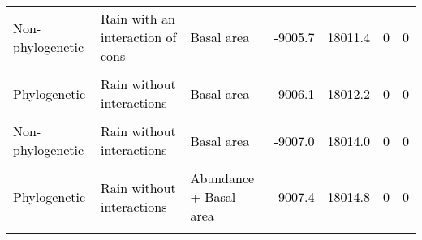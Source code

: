 \documentclass[
  12pt,
  letterpaper,
  DIV=11,
  numbers=noendperiod]{scrartcl}
\begin{document}
\begin{table}[H]
{\begin{tabular}[t]{lllllll}
\textcolor{black}{Non-phylogenetic} & \textcolor{black}{Rain with an interaction of cons} & \textcolor{black}{Basal area} & \textcolor{black}{-9005.7} & \textcolor{black}{18011.4} & \textcolor{black}{0} & \textcolor{black}{0}\\
\cellcolor{gray!6}{\textcolor{black}{Phylogenetic}} & \cellcolor{gray!6}{\textcolor{black}{Rain without interactions}} & \cellcolor{gray!6}{\textcolor{black}{Abundance}} & \cellcolor{gray!6}{\textcolor{black}{-9005.7}} & \cellcolor{gray!6}{\textcolor{black}{18011.4}} & \cellcolor{gray!6}{\textcolor{black}{0}} & \cellcolor{gray!6}{\textcolor{black}{0}}\\
\addlinespace
\textcolor{black}{Phylogenetic} & \textcolor{black}{Rain without interactions} & \textcolor{black}{Basal area} & \textcolor{black}{-9006.1} & \textcolor{black}{18012.2} & \textcolor{black}{0} & \textcolor{black}{0}\\
\cellcolor{gray!6}{\textcolor{black}{Phylogenetic}} & \cellcolor{gray!6}{\textcolor{black}{Rain with an interaction of cons}} & \cellcolor{gray!6}{\textcolor{black}{Abundance + Basal area}} & \cellcolor{gray!6}{\textcolor{black}{-9006.2}} & \cellcolor{gray!6}{\textcolor{black}{18012.5}} & \cellcolor{gray!6}{\textcolor{black}{0}} & \cellcolor{gray!6}{\textcolor{black}{0}}\\
\textcolor{black}{Non-phylogenetic} & \textcolor{black}{Rain without interactions} & \textcolor{black}{Basal area} & \textcolor{black}{-9007.0} & \textcolor{black}{18014.0} & \textcolor{black}{0} & \textcolor{black}{0}\\
\cellcolor{gray!6}{\textcolor{black}{Phylogenetic}} & \cellcolor{gray!6}{\textcolor{black}{No rain}} & \cellcolor{gray!6}{\textcolor{black}{Basal area}} & \cellcolor{gray!6}{\textcolor{black}{-9007.4}} & \cellcolor{gray!6}{\textcolor{black}{18014.8}} & \cellcolor{gray!6}{\textcolor{black}{0}} & \cellcolor{gray!6}{\textcolor{black}{0}}\\
\textcolor{black}{Phylogenetic} & \textcolor{black}{Rain without interactions} & \textcolor{black}{Abundance + Basal area} & \textcolor{black}{-9007.4} & \textcolor{black}{18014.8} & \textcolor{black}{0} & \textcolor{black}{0}\\
\addlinespace
\cellcolor{gray!6}{\textcolor{black}{Non-phylogenetic}} & \cellcolor{gray!6}{\textcolor{black}{Rain without interactions}} & \cellcolor{gray!6}{\textcolor{black}{Abundance + Basal area}} & \cellcolor{gray!6}{\textcolor{black}{-9007.6}} & \cellcolor{gray!6}{\textcolor{black}{18015.2}} & \cellcolor{gray!6}{\textcolor{black}{0}} & \cellcolor{gray!6}{\textcolor{black}{0}}\\

\end{tabular}}
\end{table}
\end{document}

